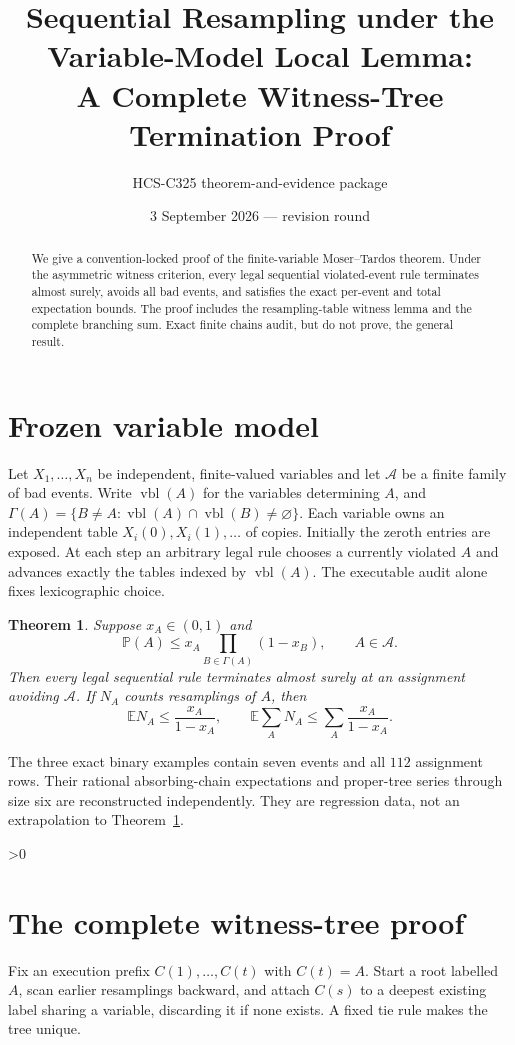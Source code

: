 \documentclass[10pt]{article}
\title{Sequential Resampling under the Variable-Model Local Lemma:\\A Complete Witness-Tree Termination Proof}
\author{HCS-C325 theorem-and-evidence package}
\date{3 September 2026 --- revision round \CRevisionRound}
\newtheorem{theorem}{Theorem}
\newcommand{\E}{\mathbb E}
\newcommand{\Prob}{\mathbb P}
\begin{document}
\maketitle
\begin{abstract}
We give a convention-locked proof of the finite-variable Moser--Tardos theorem.
Under the asymmetric witness criterion, every legal sequential violated-event
rule terminates almost surely, avoids all bad events, and satisfies the exact
per-event and total expectation bounds.  The proof includes the resampling-table
witness lemma and the complete branching sum.  Exact finite chains audit, but do
not prove, the general result.
\end{abstract}

\section{Frozen variable model}
Let $X_1,\ldots,X_n$ be independent, finite-valued variables and let
$\mathcal A$ be a finite family of bad events.  Write $\operatorname{vbl}(A)$
for the variables determining $A$, and
$\Gamma(A)=\{B\ne A:\operatorname{vbl}(A)\cap\operatorname{vbl}(B)\ne\varnothing\}$.
Each variable owns an independent table $X_i(0),X_i(1),\ldots$ of copies.
Initially the zeroth entries are exposed.  At each step an arbitrary legal rule
chooses a currently violated $A$ and advances exactly the tables indexed by
$\operatorname{vbl}(A)$.  The executable audit alone fixes lexicographic choice.

\begin{theorem}\label{thm:main}
Suppose $x_A\in(0,1)$ and
\begin{equation}\label{eq:lll}
 \Prob(A)\le x_A\prod_{B\in\Gamma(A)}(1-x_B),\qquad A\in\mathcal A.
\end{equation}
Then every legal sequential rule terminates almost surely at an assignment
avoiding $\mathcal A$.  If $N_A$ counts resamplings of $A$, then
\[
 \E N_A\le\frac{x_A}{1-x_A},\qquad
 \E\sum_A N_A\le\sum_A\frac{x_A}{1-x_A}.
\]
\end{theorem}

The three exact binary examples contain seven events and all $112$ assignment
rows.  Their rational absorbing-chain expectations and proper-tree series
through size six are reconstructed independently.  They are regression data,
not an extrapolation to Theorem~\ref{thm:main}.

\ifnum\CRevisionRound>0
\section{The complete witness-tree proof}
Fix an execution prefix $C(1),\ldots,C(t)$ with $C(t)=A$.  Start a root labelled
$A$, scan earlier resamplings backward, and attach $C(s)$ to a deepest existing
label sharing a variable, discarding it if none exists.  A fixed tie rule makes
the tree unique.
\end{document}
